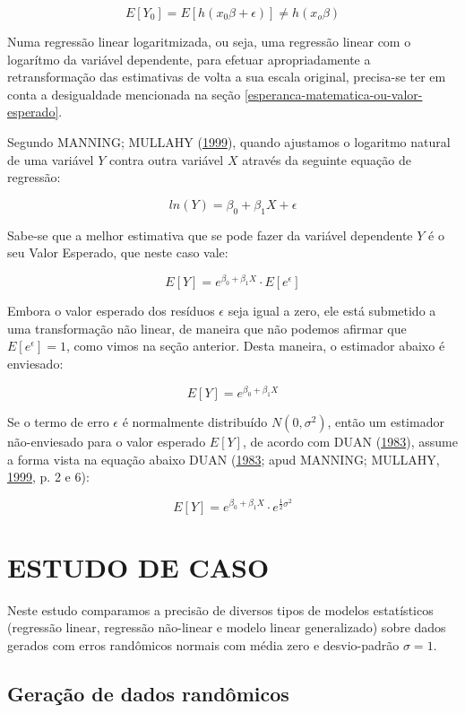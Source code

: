 \documentclass[a4paper]{article}
\begin{document}
\[E[Y_0] = E[h(x_0\beta + \epsilon)] \ne h(x_o\beta)\]

Numa regressão linear logaritmizada, ou seja, uma regressão linear com o
logarítmo da variável dependente, para efetuar apropriadamente a
retransformação das estimativas de volta a sua escala original,
precisa-se ter em conta a desigualdade mencionada na seção
\ref{esperanca-matematica-ou-valor-esperado}.

Segundo MANNING; MULLAHY (\protect\hyperlink{ref-NBERt0246}{1999}),
quando ajustamos o logaritmo natural de uma variável \(Y\) contra outra
variável \(X\) através da seguinte equação de regressão:

\[ln(Y) = \beta_0 + \beta_1X + \epsilon\]

Sabe-se que a melhor estimativa que se pode fazer da variável dependente
\(Y\) é o seu Valor Esperado, que neste caso vale:

\[E[Y] = e^{\beta_0 + \beta_1X} \cdot E[e^\epsilon]\]

Embora o valor esperado dos resíduos \(\epsilon\) seja igual a zero, ele
está submetido a uma transformação não linear, de maneira que não
podemos afirmar que \(E[e^\epsilon] = 1\), como vimos na seção anterior.
Desta maneira, o estimador abaixo é enviesado:

\[E[Y] = e^{\beta_0 + \beta_1X}\]

Se o termo de erro \(\epsilon\) é normalmente distribuído
\(N(0,\sigma^2)\), então um estimador não-enviesado para o valor
esperado \(E[Y]\), de acordo com DUAN
(\protect\hyperlink{ref-Duan}{1983}), assume a forma vista na equação
abaixo DUAN (\protect\hyperlink{ref-Duan}{1983}; apud MANNING; MULLAHY,
\protect\hyperlink{ref-NBERt0246}{1999}, p. 2 e 6):

\[E[Y] = e^{\beta_0 + \beta_1X} \cdot e^{\frac{1}{2}\sigma^2}\]

\section{ESTUDO DE CASO}\label{estudo-de-caso}

Neste estudo comparamos a precisão de diversos tipos de modelos
estatísticos (regressão linear, regressão não-linear e modelo linear
generalizado) sobre dados gerados com erros randômicos normais com média
zero e desvio-padrão \(\sigma = 1\).

\subsection{Geração de dados
randômicos}\label{geracao-de-dados-randomicos}
\end{document}
